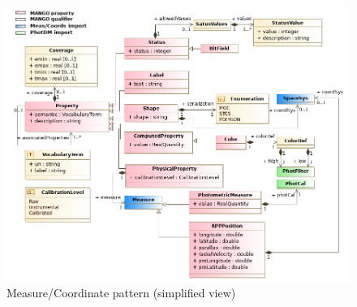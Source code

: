 \documentclass[11pt,a4paper]{ivoa}
\newcommand{\TODO}[1]{%
    \noindent%
    \colorbox{todocolor}{%
            \parbox{0.85\linewidth}{\sffamily \textbf{TODO:}\\
            #1}
    }%
    \vspace{2pt}

}
\begin{document}
%

\begin{figure}
     \includegraphics[width=1.0\textwidth]{../model/property.png}
     \caption{Measure/Coordinate pattern (simplified view)}
     \label{fig:properties}
\end{figure}
\end{document}
